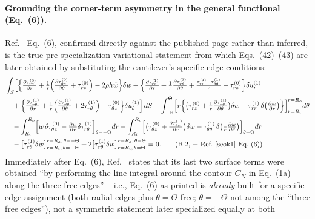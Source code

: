 \documentclass[11pt]{article}
\begin{document}
\paragraph{Grounding the corner-term asymmetry in the general functional (Eq.~(6)).}
Ref.~\cite{seok1} Eq.~(6), confirmed directly against the published
page rather than inferred, is the true pre-specialization variational
statement from which Eqs.~(42)--(43) are later obtained by substituting
the cantilever's specific edge conditions:
\begin{align}
&\int_S\!\Big[\Big\{\tfrac{\partial\tau^{(0)}_{rz}}{\partial r}
+\tfrac1r\Big(\tfrac{\partial\tau^{(0)}_{\theta z}}{\partial\theta}
+\tau^{(0)}_{rz}\Big)-2\rho h\ddot w\Big\}\delta w
+\Big\{\tfrac{\partial\tau^{(1)}_{rr}}{\partial r}
+\tfrac1r\tfrac{\partial\tau^{(1)}_{r\theta}}{\partial\theta}
+\tfrac{\tau^{(1)}_{rr}-\tau^{(1)}_{\theta\theta}}{r}
-\tau^{(0)}_{rz}\Big\}\delta u_r^{(1)} \notag\\
&\quad+\Big\{\tfrac{\partial\tau^{(1)}_{r\theta}}{\partial r}
+\tfrac1r\Big(\tfrac{\partial\tau^{(1)}_{\theta\theta}}{\partial\theta}
+2\tau^{(1)}_{r\theta}\Big)-\tau^{(0)}_{\theta z}\Big\}\delta u_\theta^{(1)}\Big]\,dS
-\int_{-\Theta}^{\Theta}\!\Big[r\Big\{\big(\tau^{(0)}_{rz}
+\tfrac1r\tfrac{\partial\tau^{(1)}_{r\theta}}{\partial\theta}\big)\delta w
-\tau^{(1)}_{rr}\,\delta\big(\tfrac{\partial w}{\partial r}\big)\Big\}\Big]_{r=R_i}^{r=R_o}d\theta \notag\\
&\quad-\int_{R_i}^{R_o}\!\Big[w\,\delta\tau^{(0)}_{\theta z}
-\tfrac{\partial w}{\partial r}\delta\tau^{(1)}_{r\theta}\Big]_{\theta=-\Theta}dr
-\int_{R_i}^{R_o}\!\Big[\big(\tau^{(0)}_{\theta z}
+\tfrac{\partial\tau^{(1)}_{\theta r}}{\partial r}\big)\delta w
-\tau^{(1)}_{\theta\theta}\,\delta\big(\tfrac1r\tfrac{\partial w}{\partial\theta}\big)\Big]_{\theta=\Theta}dr \notag\\
&\quad-\big[\tau^{(1)}_{r\theta}\delta w\big]^{r=R_o,\,\theta=-\Theta}_{r=R_i,\,\theta=-\Theta}
+2\big[\tau^{(1)}_{r\theta}\delta w\big]^{r=R_o,\,\theta=\Theta}_{r=R_i,\,\theta=\Theta}=0.
\tag{B.2, $\equiv$ Ref.~\cite{seok1} Eq.~(6)}
\end{align}
Immediately after Eq.~(6), Ref.~\cite{seok1} states that its last two
surface terms were obtained ``by performing the line integral around the
contour $C_N$ in Eq.~(1a) along the three free edges'' -- i.e., Eq.~(6) as
printed is \emph{already} built for a specific edge assignment (both radial
edges plus $\theta=\Theta$ free; $\theta=-\Theta$ not among the ``three
free edges''), not a symmetric statement later specialized equally at both
\end{document}
